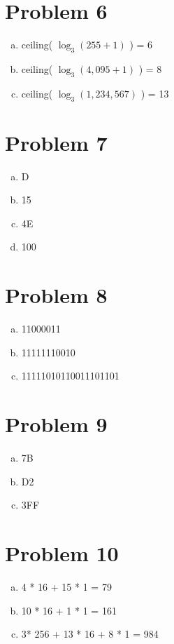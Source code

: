\documentclass[11pt]{article}
\begin{document}
\section*{Problem 6}
\begin{enumerate}[(a)]
	\item ceiling( $\log _3 (255+1)$ ) = 6
	\item ceiling( $\log _3 (4,095+1)$ ) = 8
	\item ceiling( $\log _3 (1,234,567)$ ) = 13
\end{enumerate}

\section*{Problem 7}
\begin{enumerate}[(a)]
	\item D
	\item 15
	\item 4E
	\item 100
\end{enumerate}

\section*{Problem 8}
\begin{enumerate}[(a)]
	\item 11000011
	\item 11111110010
	\item 11111010110011101101
\end{enumerate}

\section*{Problem 9}
\begin{enumerate}[(a)]
	\item 7B
	\item D2
	\item 3FF
\end{enumerate}

\section*{Problem 10}
\begin{enumerate}[(a)]
	\item 4 * 16 + 15 * 1 = 79
	\item 10 * 16 + 1 * 1 = 161
	\item 3* 256 + 13 * 16 + 8 * 1 = 984
\end{enumerate}
\end{document}
